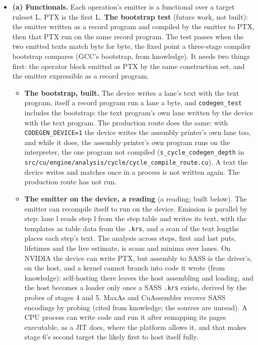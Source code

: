 \begin{enumerate}
\begin{itemize}
\item \textbf{(a) Functionals.} Each operation's emitter is a functional over a target ruleset L. PTX is the first L. \textbf{The bootstrap test} (future work, not built): the emitter written as a record program and compiled by the emitter to PTX, then that PTX run on the same record program. The test passes when the two emitted texts match byte for byte, the fixed point a three-stage compiler bootstrap compares (GCC's bootstrap, from knowledge). It needs two things first: the operator block emitted as PTX by the same construction set, and the emitter expressible as a record program.

\begin{itemize}
\item \textbf{The bootstrap, built.} The device writes a lane's text with the text program, itself a record program run a lane a byte, and \texttt{codegen\_\allowbreak{}test} includes the bootstrap: the text program's own lane written by the device with the text program. The production route does the same: with \texttt{CODEGEN\_\allowbreak{}DEVICE=1} the device writes the assembly printer's own lane too, and while it does, the assembly printer's own program runs on the interpreter, the one program not compiled (\texttt{s\_\allowbreak{}cycle\_\allowbreak{}codegen\_\allowbreak{}depth} in \texttt{src/\allowbreak{}cu/\allowbreak{}engine/\allowbreak{}analysis/\allowbreak{}cycle/\allowbreak{}cycle\_\allowbreak{}compile\_\allowbreak{}route.\allowbreak{}cu}). A text the device writes and matches once in a process is not written again. The production route has not run.
\item \textbf{The emitter on the device, a reading} (a reading; built below). The emitter can recompile itself to run on the device. Emission is parallel by step: lane l reads step l from the step table and writes its text, with the templates as table data from the \texttt{.\allowbreak{}krs}, and a scan of the text lengths places each step's text. The analysis across steps, first and last puts, lifetimes and the live estimate, is scans and minima over lanes. On NVIDIA the device can write PTX, but assembly to SASS is the driver's, on the host, and a kernel cannot branch into code it wrote (from knowledge): self-hosting there leaves the host assembling and loading, and the host becomes a loader only once a SASS \texttt{.\allowbreak{}krs} exists, derived by the probes of stages 4 and 5. MaxAs and CuAssembler recover SASS encodings by probing (cited from knowledge; the sources are unread). A CPU process can write code and run it after remapping its pages executable, as a JIT does, where the platform allows it, and that makes stage 6's second target the likely first to host itself fully.


\end{itemize}
\end{itemize}
\end{enumerate}
